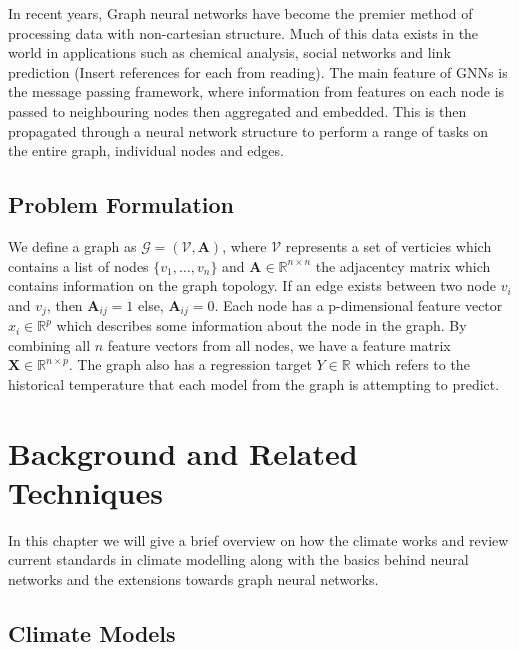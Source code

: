 \documentclass[honours,12pt]{unswthesis}
\numberwithin{equation}{section}
\begin{document}
{\noindent} In recent years, Graph neural networks have become the premier method of processing data with non-cartesian structure. Much of this data exists in the world
in applications such as chemical analysis, social networks and link prediction (Insert references for each from reading). The main feature of GNNs is the message passing framework,
where information from features on each node is passed to neighbouring nodes then aggregated and embedded. This is then propagated through a neural network structure to
perform a range of tasks on the entire graph, individual nodes and edges.        

{\section{Problem Formulation}}\label{problem-formulation}
We define a graph as ${\mathcal{G}} = ({\mathcal{V}}, \textbf{A})$, where $\mathcal{V}$ represents a set of verticies which contains a list of nodes
$\{ v_1, \dots, v_n \}$ and $\textbf{A} \in \mathbb{R}^{n \times n}$ the adjacentcy matrix which contains information on the graph topology. If an edge exists
between two node $v_i$ and $v_j$, then $\textbf{A}_{ij} = 1$ else, $\textbf{A}_{ij} = 0$. Each node has a {p}-dimensional feature vector ${x_i} \in \mathbb{R}^{p}$
which describes some information about the node in the graph. By combining all ${n}$ feature vectors from all nodes, we have a feature matrix
$\textbf{X} \in \mathbb{R}^{n\times p}$. The graph also has a regression target ${Y} \in \mathbb{R}$ which refers to the historical temperature that each model from the
graph is attempting to predict.



\chapter{Background and Related Techniques}



In this chapter we will give a brief overview on how the climate works and review 
current standards in climate modelling along with the basics
behind neural networks and the extensions towards graph neural networks.


\section{Climate Models}\label{climate}
\end{document}
